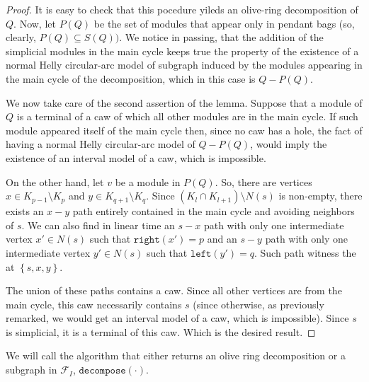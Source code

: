 \documentclass{article}
\begin{document}
\begin{proof}
        It is easy to check that this
        pocedure yileds an olive-ring
        decomposition of $Q$. 
        Now, let $P\left(Q\right)$ 
        be the set of modules that
        appear only in pendant bags
        (so, clearly, $P\left(Q\right) \subseteq S\left(Q\right))$.
        We notice
        in passing, that the addition of
        the simplicial modules in the main
        cycle keeps true the property
        of the existence of a normal
        Helly circular-arc model
        of subgraph induced
        by the modules appearing 
        in the main cycle 
        of the decomposition,
        which in this case
        is $Q - P\left(Q\right)$.
        
        We now take care of the 
        second assertion of the lemma.
        Suppose that a module of $Q$
        is a terminal of a caw of which
        all other modules are in the
        main cycle. If such module
        appeared itself of the main
        cycle then, since no
        caw has a hole, 
        the fact of having a normal Helly
        circular-arc model of $Q - P\left(Q\right)$,
        would imply the existence of 
        an interval model of a caw, which
        is impossible. 

        On the other hand, let 
        $v$ be a module in $P\left(Q\right)$.
        So, there are vertices $x \in K_{p-1} \setminus K_{p}$ 
        and $y \in K_{q+1} \setminus K_{q}$.
        Since $\left(K_{l} \cap K_{l+1}\right) \setminus N\left(s\right)$
        is non-empty, there exists an
        $x-y$ path entirely contained
        in the main cycle and avoiding
        neighbors of $s$. We can also
        find in linear time
        an $s-x$ path with only one intermediate
        vertex $x' \in N\left(s\right)$
        such that $\texttt{right}\left(x'\right)=p$
        and an $s-y$ path with only one intermediate
        vertex $y' \in N\left(s\right)$ 
        such that $\texttt{left}\left(y'\right)=q$.
        Such path witness the at $\left\{s, x, y\right\}$.

        The union of these paths contains a caw.
        Since all other vertices are from the main 
        cycle, this caw necessarily contains $s$ 
        (since otherwise, as previously remarked,
        we would get an interval model of a caw,
        which is impossible).
        Since $s$ is simplicial, 
        it is a terminal of this caw.
        Which is the desired result.
    \end{proof}
    
    We will call the algorithm
    that either returns an olive ring
    decomposition or a subgraph in $\mathcal{F}_{I}$,
    $\texttt{decompose}\left(\cdot\right)$.
    
\end{document}
